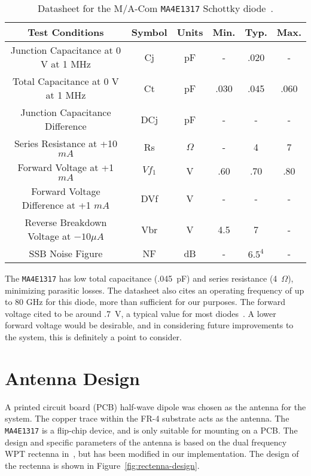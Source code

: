 \def\arraystretch{2}
\begin{table}[h!]
\centering
\begin{tabular}{|c|c|c|c|c|c|}
\hline
\textbf{Test Conditions} & \textbf{Symbol} & \textbf{Units} & \textbf{Min.} & \textbf{Typ.} & \textbf{Max.} \\ \hline
Junction Capacitance at 0 V at 1 MHz & Cj & pF & - & .020 & - \\ \hline
Total Capacitance at 0 V at 1 MHz & Ct & pF & .030 & .045 & .060 \\ \hline
Junction Capacitance Difference & DCj & pF & - & - & - \\ \hline
Series Resistance at +10 $mA$ & Rs & $\Omega$ & - & 4 & 7 \\ \hline
Forward Voltage at +1 $mA$ & $Vf_1$ & V & .60 & .70 & .80 \\ \hline
Forward Voltage Difference at +1 $mA$ & DVf & V & - & - & - \\ \hline
Reverse Breakdown Voltage at $-10 \mu A$ & Vbr & V & 4.5 & 7 & - \\ \hline
SSB Noise Figure & NF & dB & - & $6.5^4$ & - \\ \hline
\end{tabular}
\caption[Datasheet for diode used in rectenna construction]{Datasheet for the M/A-Com \texttt{MA4E1317} Schottky diode~\cite{ma4e1317-datasheet}.}
\label{tab:rectenna-datasheet}
\end{table}

The \texttt{MA4E1317} has low total capacitance (.045~pF) and series resistance (4~$\Omega$), minimizing parasitic losses. The datasheet also cites an operating frequency of up to 80 GHz for this diode, more than sufficient for our purposes. The forward voltage cited to be around .7~V, a typical value for most diodes~\cite{ma4e1317-datasheet}. A lower forward voltage would be desirable, and in considering future improvements to the system, this is definitely a point to consider.

\section{Antenna Design}
\label{sec:rectenna-antenna}

A printed circuit board (PCB) half-wave dipole was chosen as the antenna for the system. The copper trace within the FR-4 substrate acts as the antenna. The \texttt{MA4E1317} is a flip-chip device, and is only suitable for mounting on a PCB. The design and specific parameters of the antenna is based on the dual frequency WPT rectenna in~\cite{suh2002high}, but has been modified in our implementation. The design of the rectenna is shown in Figure~\ref{fig:rectenna-design}.


